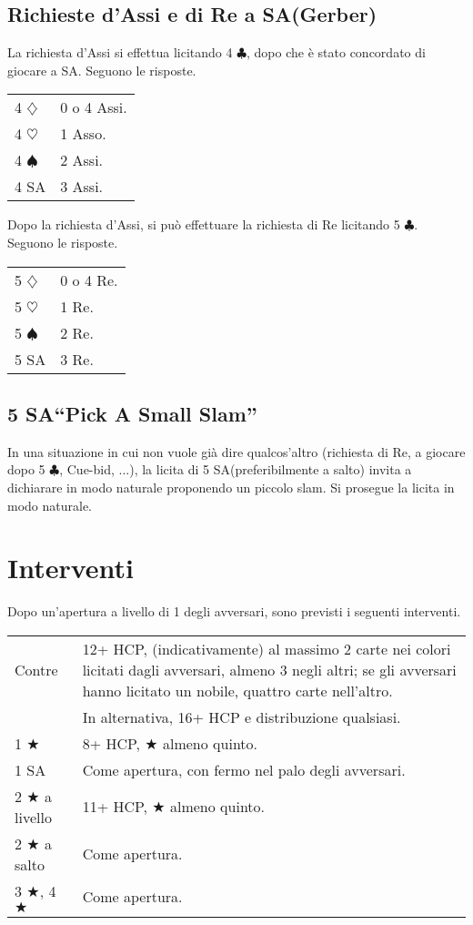 \documentclass[a4paper,10pt]{article}
\renewcommand{\c}{$\clubsuit$\xspace}
\renewcommand{\d}{$\diamondsuit$\xspace}
\newcommand{\h}{$\heartsuit$\xspace}
\newcommand{\s}{$\spadesuit$\xspace}
\renewcommand{\j}{$\bigstar$\xspace}
\newcommand{\sa}{SA\xspace}
\newcommand{\smallspace}{\vskip0.3cm}
\newenvironment{twocol}
  {\smallspace\noindent\begin{tabular}{l p{0.78\textwidth}}}
  {\end{tabular}\smallspace}
\begin{document}
\subsection{Richieste d'Assi e di Re a \sa (Gerber)}

La richiesta d'Assi si effettua licitando 4 \c, dopo che è stato concordato di giocare a \sa. Seguono le risposte.
\begin{twocol}
  4 \d & 0 o 4 Assi.\\
  4 \h & 1 Asso.\\
  4 \s & 2 Assi.\\
  4 \sa & 3 Assi.
\end{twocol}

\noindent Dopo la richiesta d'Assi, si può effettuare la richiesta di Re licitando 5 \c. Seguono le risposte.
\begin{twocol}
  5 \d & 0 o 4 Re.\\
  5 \h & 1 Re.\\
  5 \s & 2 Re.\\
  5 \sa & 3 Re.
\end{twocol}


\subsection{5 \sa ``Pick A Small Slam''}

In una situazione in cui non vuole già dire qualcos'altro (richiesta di Re, a giocare dopo 5 \c, Cue-bid, ...), la licita di 5 \sa (preferibilmente a salto) invita a dichiarare in modo naturale proponendo un piccolo slam. Si prosegue la licita in modo naturale.



\pagebreak
\section{Interventi}

Dopo un'apertura a livello di 1 degli avversari, sono previsti i seguenti interventi.

\begin{twocol}
  Contre & 12+ HCP, (indicativamente) al massimo 2 carte nei colori licitati dagli avversari, almeno 3 negli altri; se gli avversari hanno licitato un nobile, quattro carte nell'altro. \\
  & In alternativa, 16+ HCP e distribuzione qualsiasi.\\
  1 \j & 8+ HCP, \j almeno quinto.\\
  1 \sa & Come apertura, con fermo nel palo degli avversari.\\
  2 \j a livello & 11+ HCP, \j almeno quinto.\\
  2 \j a salto & Come apertura.\\
  3 \j, 4 \j & Come apertura.
\end{twocol}
\end{document}
